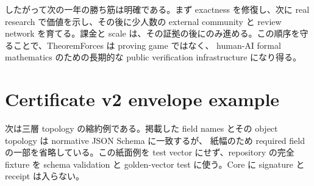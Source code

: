\documentclass[a4paper,11pt]{ltjsarticle}
\begin{document}
したがって次の一年の勝ち筋は明確である。まず exactness を修復し、次に real research で価値を示し、その後に少人数の external community と
review network を育てる。課金と scale は、その証拠の後にのみ進める。この順序を守ることで、TheoremForces は proving game ではなく、
human-AI formal mathematics のための長期的な public verification infrastructure になり得る。

\appendix
\section{Certificate v2 envelope example}

次は三層 topology の縮約例である。掲載した field names とその object topology は normative JSON Schema に一致するが、
紙幅のため required field の一部を省略している。この紙面例を test vector にせず、repository の完全 fixture を
schema validation と golden-vector test に使う。Core に signature と receipt は入らない。
\end{document}
